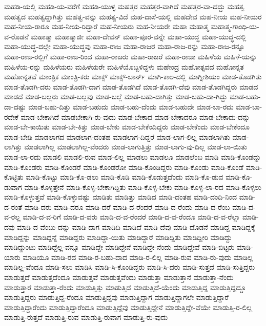 {ಮಹಡಿ-ಯಲ್ಲಿ
ಮಹಡಿ-ಯ-ವರೆಗೆ
ಮಹಡಿ-ಯುಳ್ಳ
ಮಹತ್ತರ
ಮಹತ್ತರ-ವಾಗಿದೆ
ಮಹತ್ತರ-ವಾ-ದದ್ದು
ಮಹತ್ವ
ಮಹತ್ವದ
ಮಹತ್ವದ್ದಾಗಿತ್ತು
ಮಹತ್ವ-ವನ್ನು
ಮಹತ್ವ-ವಿದೆ
ಮಹ-ದಾಸೆ-ಯಲ್ಲಿ
ಮಹದೇವ
ಮಹ-ನೀಯ
ಮಹ-ನೀಯರ
ಮಹ-ನೀಯ-ರಾರೂ
ಮಹ-ನೀಯ-ರಿದ್ದಾರೆ
ಮಹ-ನೀಯರು
ಮಹ-ನೀಯರೇ
ಮಹಾ
ಮಹಾತ್ಮ
ಮಹಾತ್ಮ-ಗಾಂಧಿ-ಯ-ವ-ರೊಡನೆ
ಮಹಾತ್ಮಾ
ಮಹಾತ್ಮಾಜೀ
ಮಹಾ-ದೇವನ್
ಮಹಾ-ಪೂರ-ವನ್ನೇ
ಮಹಾ-ಯುದ್ಧ
ಮಹಾ-ಯುದ್ಧ-ದಲ್ಲಿ
ಮಹಾ-ಯುದ್ಧ-ದಲ್ಲೇ
ಮಹಾ-ಯುದ್ಧವು
ಮಹಾ-ರಾಜ
ಮಹಾ-ರಾಜರ
ಮಹಾ-ರಾಜ-ರನ್ನು
ಮಹಾ-ರಾಜ-ರನ್ನೂ
ಮಹಾ-ರಾಜ-ರಲ್ಲಿಗೆ
ಮಹಾ-ರಾಜ-ರಿಂದ
ಮಹಾ-ರಾಜರು
ಮಹಾ-ರಾಜರೆ
ಮಹಾ-ರಾಜಾ
ಮಹಿಳೆಯ
ಮಹಿಳೆ-ಯನ್ನು
ಮಹಿಳೆಯ-ರನ್ನು
ಮಹಿಳೆಯರು
ಮಹಿಳೆಯರೇ
ಮಹಿಳೆಯೊಬ್ಬಳಿದ್ದಳು
ಮಹೇಂದ್ರ
ಮಹೋತ್ಸವದ
ಮಹೋನ್ನತ
ಮಹೋನ್ನತವೆ
ಮಾಂತ್ರಿಕ
ಮಾಂತ್ರಿ-ಕರು
ಮಾಕ್ಸ್
ಮಾಕ್ಸ್-ಬಾರ್ನ್
ಮಾಗಿ-ಕಾಲ-ದಲ್ಲಿ
ಮಾಗ್ನೀಶಿಯಂ
ಮಾಡ-ತೊಡಗಿತು
ಮಾಡ-ತೊಡಗಿ-ದರು
ಮಾಡ-ತೊಡಗಿ-ದಾಗ
ಮಾಡ-ತೊಡಗಿದೆ
ಮಾಡ-ತೊಡಗಿ-ದೆವು
ಮಾಡ-ತೊಡಗಿದ್ದರು
ಮಾಡದ
ಮಾಡದೆ
ಮಾಡ-ಬಲ್ಲರು
ಮಾಡ-ಬಲ್ಲವು
ಮಾಡ-ಬಲ್ಲೆ
ಮಾಡ-ಬಹು-ದಾಗಿತ್ತು
ಮಾಡ-ಬಹು-ದಾ-ಗಿದ್ದು
ಮಾಡ-ಬಹು-ದಾ-ದಷ್ಟು
ಮಾಡ-ಬಹು-ದಿತ್ತು
ಮಾಡ-ಬಹುದು
ಮಾಡ-ಬಹು-ದೆಂದು
ಮಾಡ-ಬಹುದೇ
ಮಾಡ-ಬಾ-ರದು
ಮಾಡ-ಬಾ-ರದೇಕೆ
ಮಾಡ-ಬೇಕಾಗಿದೆ
ಮಾಡಬೇಕಾಗಿ-ರು-ವುದು
ಮಾಡ-ಬೇಕಾದ
ಮಾಡ-ಬೇಕಾದರೂ
ಮಾಡ-ಬೇಕಾದು-ದನ್ನು
ಮಾಡ-ಬೇ-ಕಾಯಿತು
ಮಾಡ-ಬೇ-ಕಿತ್ತು
ಮಾಡ-ಬೇಕು
ಮಾಡ-ಬೇಕೆಂದಿದ್ದರು
ಮಾಡ-ಬೇಕೆಂದು
ಮಾಡ-ಬೇಕೆಂದೂ
ಮಾಡ-ಬೇಡಿ
ಮಾಡಲಾಗದ
ಮಾಡಲಾಗ-ದಂತಹ
ಮಾಡಲಾಗ-ದಿದ್ದರೆ
ಮಾಡ-ಲಾಗ-ಲಿಲ್ಲ
ಮಾಡಲಾಗಿತು
ಮಾಡ-ಲಾಗಿತ್ತು
ಮಾಡಲಾಗಿಲ್ಲ
ಮಾಡಲಾಗಿಲ್ಲ-ವೆಂದರು
ಮಾಡ-ಲಾಗುತ್ತಿತ್ತು
ಮಾಡ-ಲಾಗು-ವು-ದಿಲ್ಲ
ಮಾಡ-ಲಾ-ಯಿತು
ಮಾಡ-ಲಾ-ರದು
ಮಾಡಲಿ
ಮಾಡಲಿ-ರುವ
ಮಾಡ-ಲಿಲ್ಲ
ಮಾಡಲು
ಮಾಡಲೂ
ಮಾಡಲೆಂಬ
ಮಾಡಿ
ಮಾಡಿ-ಕೊಂಡದ್ದು
ಮಾಡಿ-ಕೊಂಡರು
ಮಾಡಿ-ಕೊಂಡರೆ
ಮಾಡಿ-ಕೊಂಡರೋ
ಮಾಡಿ-ಕೊಂಡಿದ್ದರು
ಮಾಡಿ-ಕೊಂಡು
ಮಾಡಿ-ಕೊಂಡೆ
ಮಾಡಿ-ಕೊಟ್ಟಿತು
ಮಾಡಿ-ಕೊಟ್ಟು
ಮಾಡಿ-ಕೊ-ಡಲು
ಮಾಡಿ-ಕೊಡಿ
ಮಾಡಿ-ಕೊಡುತ್ತದೆಂದು
ಮಾಡಿ-ಕೊ-ಡುವ
ಮಾಡಿ-ಕೊ-ಡುವಾಗ
ಮಾಡಿ-ಕೊಳ್ಳತ್ತೇನೆ
ಮಾಡಿ-ಕೊಳ್ಳ-ಬೇಕಾಗಿದ್ದಿತು
ಮಾಡಿ-ಕೊಳ್ಳ-ಬೇಕು
ಮಾಡಿ-ಕೊಳ್ಳ-ಲಾ-ರದ
ಮಾಡಿ-ಕೊಳ್ಳಲು
ಮಾಡಿ-ಕೊಳ್ಳುತ್ತವೆ
ಮಾಡಿ-ಕೊಳ್ಳುವಷ್ಟು
ಮಾಡಿತು
ಮಾಡಿತ್ತು
ಮಾಡಿದ
ಮಾಡಿ-ದಂತಹ
ಮಾಡಿ-ದಂದಿ-ನಿಂದ
ಮಾಡಿ-ದ-ರಂತೆ
ಮಾಡಿ-ದರು
ಮಾಡಿ-ದರೂ
ಮಾಡಿ-ದರೆ
ಮಾಡಿ-ದ-ರೆಂದರೆ
ಮಾಡಿ-ದ-ರೆಂದು
ಮಾಡಿ-ದ-ರೆಂಬ
ಮಾಡಿ-ದ-ವ-ರಲ್ಲ
ಮಾಡಿ-ದ-ವ-ರಿಗೆ
ಮಾಡಿ-ದ-ವರು
ಮಾಡಿ-ದ-ವ-ರೆಂದರೆ
ಮಾಡಿ-ದ-ವ-ರೆಂದೂ
ಮಾಡಿ-ದ-ವ-ರೆಲ್ಲಾ
ಮಾಡಿ-ದವು
ಮಾಡಿ-ದ-ವೆಂಬು-ದನ್ನು
ಮಾಡಿ-ದಾಗ
ಮಾಡಿದಿ
ಮಾಡಿದೆ
ಮಾಡಿ-ದೆವು
ಮಾಡಿ-ದೊಡನೆ
ಮಾಡಿದ್ದ
ಮಾಡಿದ್ದಕ್ಕೆ
ಮಾಡಿದ್ದನ್ನು
ಮಾಡಿದ್ದನ್ನೆ
ಮಾಡಿದ್ದರು
ಮಾಡಿದ್ದಾ-ಯಿತು
ಮಾಡಿದ್ದಾರೆ
ಮಾಡಿದ್ದಿತು
ಮಾಡಿದ್ದೀರಿ
ಮಾಡಿದ್ದು
ಮಾಡಿದ್ದುಂಟು
ಮಾಡಿದ್ದೆಲ್ಲ-ವನ್ನೂ
ಮಾಡಿದ್ದೇ
ಮಾಡಿದ್ದೇನೆ
ಮಾಡಿದ್ದೇ-ನೆಂದು
ಮಾಡಿದ್ದೇವೆ
ಮಾಡಿ-ಬಿಟ್ಟರು
ಮಾಡಿ-ಯಾರು
ಮಾಡಿಯೂ
ಮಾಡಿ-ರದ
ಮಾಡಿ-ರ-ಬಹು-ದಾದ
ಮಾಡಿ-ರ-ಲಿಲ್ಲ
ಮಾಡಿ-ರುವ
ಮಾಡಿ-ರು-ವುದು
ಮಾಡಿಲ್ಲ
ಮಾಡಿಲ್ಲ-ವೆಂದೂ
ಮಾಡಿ-ಸಲು
ಮಾಡಿಸಿ
ಮಾಡಿ-ಸಿ-ಕೊಂಡಿದ್ದರು
ಮಾಡಿ-ಸಿ-ದರು
ಮಾಡಿ-ಸುತ್ತದೆ
ಮಾಡಿ-ಸುತ್ತಿದ್ದರು
ಮಾಡುತ್ತದೆ
ಮಾಡುತ್ತದೆಂದೂ
ಮಾಡುತ್ತವೆ
ಮಾಡುತ್ತವೆಂದು
ಮಾಡುತ್ತಾ
ಮಾಡುತ್ತಾನೆ
ಮಾಡುತ್ತಾ-ನೆಂದು
ಮಾಡುತ್ತಾರೆ
ಮಾಡುತ್ತಾ-ರೆಂದು
ಮಾಡುತ್ತಿತ್ತು
ಮಾಡುತ್ತಿದೆ
ಮಾಡುತ್ತಿದೆ-ಯೆಂದು
ಮಾಡುತ್ತಿದ್ದ
ಮಾಡುತ್ತಿದ್ದದ್ದೂ
ಮಾಡುತ್ತಿದ್ದರು
ಮಾಡುತ್ತಿದ್ದ-ರೆಂದೂ
ಮಾಡುತ್ತಿದ್ದವು
ಮಾಡುತ್ತಿದ್ದಾಗ
ಮಾಡುತ್ತಿದ್ದಾಗಲೇ
ಮಾಡುತ್ತಿದ್ದಾರೆ
ಮಾಡುತ್ತಿದ್ದಾರೆಂದು
ಮಾಡುತ್ತಿದ್ದಾರೆಂದೂ
ಮಾಡುತ್ತಿದ್ದೆವು
ಮಾಡುತ್ತಿದ್ದೇನೆ
ಮಾಡುತ್ತಿದ್ದೇ-ವೆಯೇ
ಮಾಡುತ್ತಿ-ರ-ಲಿಲ್ಲ
ಮಾಡುತ್ತಿ-ರುತ್ತದೆ
ಮಾಡುತ್ತಿ-ರುವ
ಮಾಡುತ್ತಿ-ರುವಾಗ
ಮಾಡುತ್ತಿ-ರು-ವುದು
}
